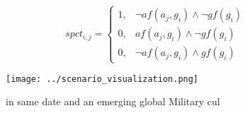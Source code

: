 \documentclass[a4paper]{article}
\begin{document}
\begin{equation}
spct_{i,j} =
\begin{cases}
1, & \text{$\neg af(a_j,g_i) \wedge \neg gf(g_i)$}\\
0, & \text{$af(a_j,g_i) \wedge \neg gf(g_i)$}\\
0, & \text{$\neg af(a_j,g_i) \wedge gf(g_i)$}
\end{cases}
\end{equation}

\begin{figure}
\centering
\texttt{[image: ../scenario\_visualization.png]}
\caption{ in same date and an emerging global Military cul
}
\end{figure}
 
\end{document}

